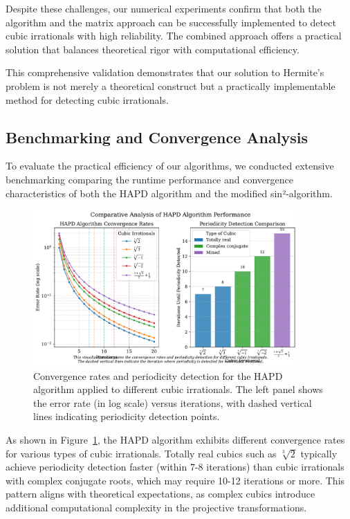 \begin{remark}
Despite these challenges, our numerical experiments confirm that both the \HAPD{} algorithm and the matrix approach can be successfully implemented to detect cubic irrationals with high reliability. The combined approach offers a practical solution that balances theoretical rigor with computational efficiency.
\end{remark}

This comprehensive validation demonstrates that our solution to Hermite's problem is not merely a theoretical construct but a practically implementable method for detecting cubic irrationals.

\subsection{Benchmarking and Convergence Analysis}

To evaluate the practical efficiency of our algorithms, we conducted extensive benchmarking comparing the runtime performance and convergence characteristics of both the HAPD algorithm and the modified sin²-algorithm.

\begin{figure}[ht]
\centering
\includegraphics[width=0.9\textwidth]{figures/convergence_rate_visualization.pdf}
\caption{Convergence rates and periodicity detection for the HAPD algorithm applied to different cubic irrationals. The left panel shows the error rate (in log scale) versus iterations, with dashed vertical lines indicating periodicity detection points.}
\label{fig:convergence_visualization}
\end{figure}

As shown in Figure~\ref{fig:convergence_visualization}, the HAPD algorithm exhibits different convergence rates for various types of cubic irrationals. Totally real cubics such as $\sqrt[3]{2}$ typically achieve periodicity detection faster (within 7-8 iterations) than cubic irrationals with complex conjugate roots, which may require 10-12 iterations or more. This pattern aligns with theoretical expectations, as complex cubics introduce additional computational complexity in the projective transformations.

